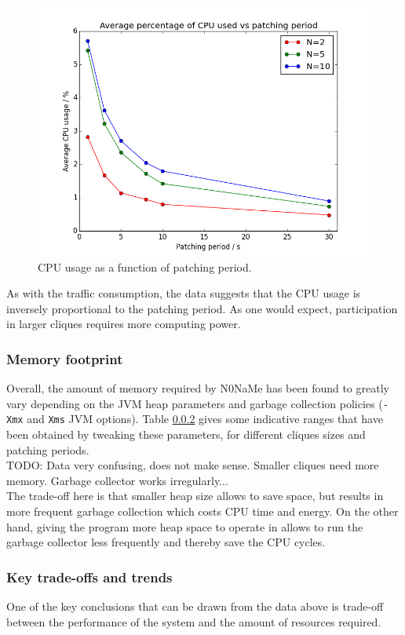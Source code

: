 \documentclass[a4paper, twoside, 12pt]{report}
\newcommand{\funkytt}{\fontfamily{AnonymousPro}\selectfont}
\begin{document}
\begin{figure}[H]
    \captionsetup{width=0.9\textwidth}
    \centering
    \includegraphics[width=0.65\linewidth]{pics/eval/cpu_vs_period.png}
    \caption{\label{fig:cpu_vs_period} CPU usage as a function of patching period.}
\end{figure}

As with the traffic consumption, the data suggests that the CPU usage is inversely proportional to the patching period. As one would expect, participation in larger cliques requires more computing power.

\subsubsection{Memory footprint}
Overall, the amount of memory required by {\funkytt N0NaMe} has been found to greatly vary depending on the JVM heap parameters and garbage collection policies (\texttt{-Xmx} and \texttt{Xms} JVM options). Table \ref{} gives some indicative ranges that have been obtained by tweaking these parameters, for different cliques sizes and patching periods. \\

{\color{red} TODO: Data very confusing, does not make sense. Smaller cliques need more memory. Garbage collector works irregularly...} \\

The trade-off here is that smaller heap size allows to save space, but results in more frequent garbage collection which costs CPU time and energy. On the other hand, giving the program more heap space to operate in allows to run the garbage collector less frequently and thereby save the CPU cycles. 







\subsubsection{Key trade-offs and trends}
One of the key conclusions that can be drawn from the data above is trade-off between the performance of the system and the amount of resources required. \\
\end{document}
